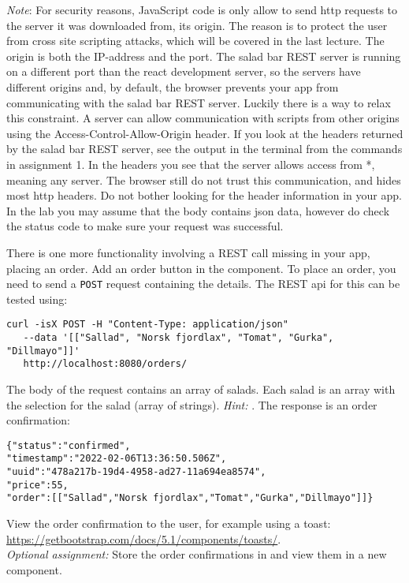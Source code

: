 \documentclass[fleqn, article, a4paper]{memoir}
\begin{document}
\begin{Assignments}
\emph{Note}: For security reasons, JavaScript code is only allow to send http requests to the server it was downloaded from, its origin. The reason is to protect the user from cross site scripting attacks, which will be covered in the last lecture. The origin is both the IP-address and the port. The salad bar REST server is running on a different port than the react development server, so the servers have different origins and, by default, the browser prevents your app from communicating with the salad bar REST server. Luckily there is a way to relax this constraint. A server can allow communication with scripts from other origins using the Access-Control-Allow-Origin header. If you look at the headers returned by the salad bar REST server, see the output in the terminal from the  commands in assignment 1. In the headers you see that the server allows access from *, meaning any server. The browser still do not trust this communication, and hides most http headers. Do not bother looking for the header information in your app. In the lab you may assume that the body contains json data, however do check the status code to make sure your request was successful.

\item There is one more functionality involving a REST call missing in your app, placing an order. Add an order button in the  component. To place an order, you need to send a \texttt{POST} request containing the details. The REST api for this can be tested using:
\\ \noindent \begin{verbatim}
curl -isX POST -H "Content-Type: application/json" 
   --data '[["Sallad", "Norsk fjordlax", "Tomat", "Gurka", "Dillmayo"]]'
   http://localhost:8080/orders/
\end{verbatim}
\noindent The body of the request contains an array of salads. Each salad is an array with the selection for the salad (array of strings). \emph{Hint:} . The response is an order confirmation:
\begin{verbatim}
{"status":"confirmed",
"timestamp":"2022-02-06T13:36:50.506Z",
"uuid":"478a217b-19d4-4958-ad27-11a694ea8574",
"price":55,
"order":[["Sallad","Norsk fjordlax","Tomat","Gurka","Dillmayo"]]}
\end{verbatim}
\noindent View the order confirmation to the user, for example using a toast: \url{https://getbootstrap.com/docs/5.1/components/toasts/}. 
\\\emph{Optional assignment:} Store the order confirmations in  and view them in a new component.


\end{Assignments}
\end{document}
